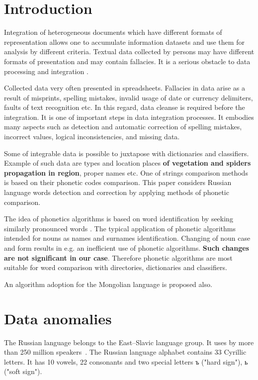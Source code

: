 \documentclass{svproc}
\begin{document}
\section{Introduction}
Integration of heterogeneous documents which have different formats of representation allows one to accumulate information datasets and use them for analysis by different criteria. Textual data collected by persons may have different formats of presentation and may contain fallacies. It is a serious obstacle to data processing and integration  \cite{Storeya-2017}.

Collected data very often presented in spreadsheets. Fallacies in data arise as a result of misprints, spelling mistakes, invalid usage of date or currency delimiters, faults of text recognition etc. In this regard, data cleanse is required before the integration. It is one of important steps in data integration processes. It embodies many aspects such as detection and automatic correction of spelling mistakes, incorrect values, logical inconsistencies, and missing data.

Some of integrable data is possible to juxtapose with dictionaries and classifiers. Example of such data are types and location places \textbf{of vegetation and spiders propagation in region}, proper names etc. One of strings comparison methods is based on their phonetic codes comparison. This paper considers Russian language words detection and correction by applying methods of phonetic comparison.

The idea of phonetics algorithms is based on word identification by seeking similarly pronounced words \cite{Parmar-2014}. The typical application of phonetic algorithms intended for nouns as names and surnames \cite{Zahoransky-2015} identification. Changing of noun case and form results in e.g. an inefficient use of phonetic algorithms. \textbf{Such changes are not significant in our case}. Therefore phonetic algorithms are most suitable for word comparison with directories, dictionaries and classifiers.

An algorithm adoption for the Mongolian language is proposed also.

\section{Data anomalies}
The Russian language belongs to the East--Slavic language group. It uses by more than 250 million speakers~\cite{Cubberley-2002}. The Russian language alphabet contains 33 Cyrillic letters. It has 10 vowels, 22 consonants and two special letters ъ ("hard sign"), ь ("soft sign").
\end{document}
